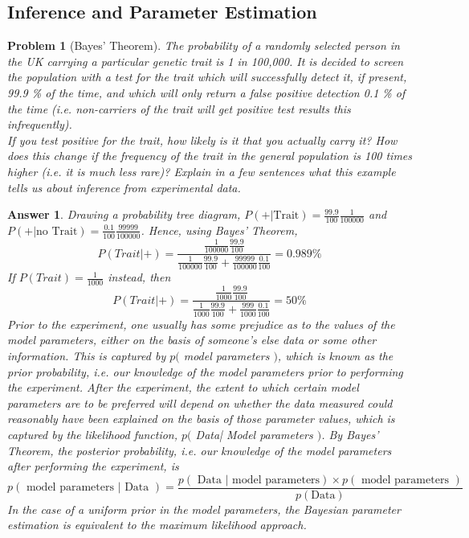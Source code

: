 \documentclass[a4paper]{article}
\newtheorem{ans}{Answer}[section]
\theoremstyle{new}
\newtheorem{qns}{Problem}[section]
\begin{document}
\subsection{Inference and Parameter Estimation}
\begin{qns}[Bayes' Theorem]
The probability of a randomly selected person in the UK carrying a particular genetic trait is 1 in 100,000. It is decided to screen the population with a test for the trait which will
successfully detect it, if present, 99.9 \% of the time, and which will only return a false positive detection 0.1 \% of the time (i.e. non-carriers of the trait will get positive test results this infrequently).\\[5pt]
If you test positive for the trait, how likely is it that you actually carry it? How does this change if the frequency of the trait in the general population is 100 times higher (i.e. it is much less rare)? Explain in a few sentences what this example tells us about inference from experimental data.
\end{qns}
\begin{ans}
Drawing a probability tree diagram, $P(+|\text{Trait})=\frac{99.9}{100}\frac{1}{100000}$ and $P(+|\text{no Trait})=\frac{0.1}{100}\frac{99999}{100000}$. Hence, using Bayes' Theorem,
$$P(Trait|+)=\frac{\frac{1}{100000}\frac{99.9}{100}}{\frac{1}{100000}\frac{99.9}{100}+\frac{99999}{100000}\frac{0.1}{100}}=0.989\%$$
If $P(Trait)=\frac{1}{1000}$ instead, then $$P(Trait|+)=\frac{\frac{1}{1000}\frac{99.9}{100}}{\frac{1}{1000}\frac{99.9}{100}+\frac{999}{1000}\frac{0.1}{100}}=50\%$$
Prior to the experiment, one usually has some prejudice as to the values of the model parameters, either on the basis of someone's else data or some other information. This is captured by $p($ model parameters $)$, which is known as the prior probability, i.e. our knowledge of the model parameters prior to performing the experiment. After the experiment, the extent to which certain model parameters are to be preferred will depend on whether the data measured could reasonably have been explained on the basis of those parameter values, which is captured by the likelihood function, $p($ Data| Model parameters $)$. By Bayes' Theorem, the posterior probability, i.e. our knowledge of the model parameters after performing the experiment, is
$$p(\text{ model parameters | Data })=\frac{p(\text{ Data | model parameters})\times p(\text{ model parameters })}{p(\text{Data})}$$
In the case of a uniform prior in the model parameters, the Bayesian parameter estimation is equivalent to the maximum likelihood approach.
\end{ans}
\end{document}
